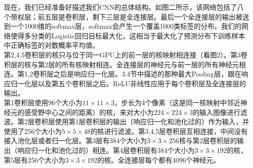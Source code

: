 现在，我们已经准备好描述我们CNN的总体结构。如图二所示，该网络包括了八个带权层；前五层是卷积层，剩下三层是全连接层。最后一个全连接层的输出被送到一个1000维的softmax层，softmax会产生一个覆盖1000类标签的分布。我们的网络使得多分类的Logistic回归目标最大化，这相当于最大化了预测分布下训练样本中正确标签的对数概率平均值。\\

第2,4,5卷积层的核只与位于同一GPU上的前一层的核映射相连接（看图2）。第3卷积层的核与第2层的所有核映射相连。全连接层的神经元与前一层的所有神经元相连。第1,2卷积层之后是响应归一化层。3.4节中描述的那种最大Pooling层，跟在响应归一化层以及第五个卷积层之后。ReLU非线性应用于每个卷积层及全连接层的输出。\\

第1卷积层使用96个大小为$11\times11\times3$，步长为4个像素（这是同一核映射中邻近神经元的感受野中心之间的距离）的核，来对大小为$224\times224\times3$的输入图像进行滤波。第2层卷积层使用第1层卷积层的输出（响应归一化和池化过的）作为输入，并使用了256个大小为$5\times5\times48$的核进行滤波。第3,4,5层卷积层互相连接，中间没有接入池化层或者归一化层。第3层有384个大小为$3\times3\times256$核与第2层卷积层的输出（响应归一化和池化过的）相连。第4层卷积层有384个大小为$3\times3\times192$的核，第5层有256个大小为$3\times3\times192$的核。全连接层每个都有4096个神经元。\\